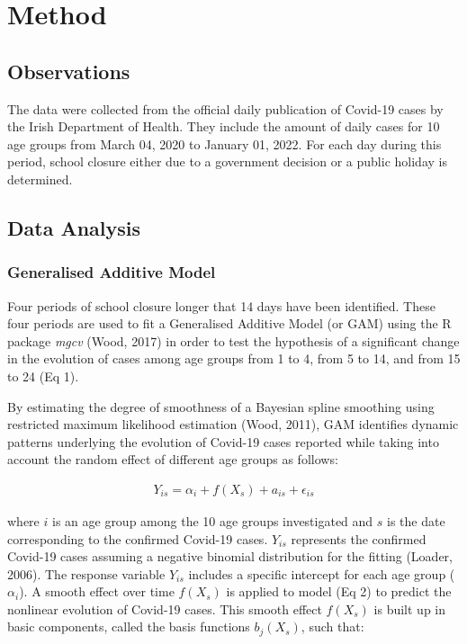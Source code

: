 \documentclass[]{elsarticle} %
\begin{document}
\hypertarget{method}{%
\section{Method}\label{method}}

\hypertarget{observations}{%
\subsection{Observations}\label{observations}}

The data were collected from the official daily publication of Covid-19 cases by the Irish Department of Health. They include the amount of daily cases for 10 age groups from March 04, 2020 to January 01, 2022. For each day during this period, school closure either due to a government decision or a public holiday is determined.

\hypertarget{data-analysis}{%
\subsection{Data Analysis}\label{data-analysis}}

\hypertarget{generalised-additive-model}{%
\subsubsection{Generalised Additive Model}\label{generalised-additive-model}}

Four periods of school closure longer that 14 days have been identified. These four periods are used to fit a Generalised Additive Model (or GAM) using the R package \emph{mgcv} (Wood, 2017) in order to test the hypothesis of a significant change in the evolution of cases among age groups from 1 to 4, from 5 to 14, and from 15 to 24 (Eq 1).

By estimating the degree of smoothness of a Bayesian spline smoothing using restricted maximum likelihood estimation (Wood, 2011), GAM identifies dynamic patterns underlying the evolution of Covid-19 cases reported while taking into account the random effect of different age groups as follows:

\begin{align}
Y_{is} = \alpha_{i} + f(X_{s}) + a_{is} + \epsilon_{is}
\end{align}

\noindent where \(i\) is an age group among the 10 age groups investigated and \(s\) is the date corresponding to the confirmed Covid-19 cases. \(Y_{is}\) represents the confirmed Covid-19 cases assuming a negative binomial distribution for the fitting (Loader, 2006). The response variable \(Y_{is}\) includes a specific intercept for each age group (\(\alpha_{i}\)). A smooth effect over time \(f(X_{s})\) is applied to model (Eq 2) to predict the nonlinear evolution of Covid-19 cases. This smooth effect \(f(X_{s})\) is built up in basic components, called the basis functions \(b_{j}(X_{s})\), such that:
\end{document}
